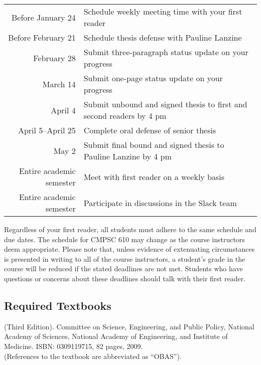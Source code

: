 \begin{center}
\begin{tabular}{r|l}
\hline

Before January 24  & Schedule weekly meeting time with your first reader \\
Before February 21 & Schedule thesis defense with Pauline Lanzine \\
February 28        & Submit three-paragraph status update on your progress \\
March 14           & Submit one-page status update on your progress \\
April 4            & Submit unbound and signed thesis to first and second readers by 4 pm \\
April 5--April 25  & Complete oral defense of senior thesis \\
May 2              & Submit final bound and signed thesis to Pauline Lanzine by 4 pm\\

\hline
Entire academic semester & Meet with first reader on a weekly basis \\
Entire academic semester & Participate in discussions in the Slack team \\
\hline
\end{tabular}
\end{center}

\noindent Regardless of your first reader, all students must adhere to the same schedule and due dates. The schedule for
CMPSC 610 may change as the course instructors deem appropriate. Please note that, unless evidence of extenuating
circumstances is presented in writing to all of the course instructors, a student's grade in the course will be reduced
if the stated deadlines are not met. Students who have questions or concerns about these deadlines should talk with
their first reader.

\vspace{-.15in}
\subsection*{Required Textbooks}
\vspace{-.05in}

 (Third Edition). Committee on Science,
Engineering, and Public Policy, National Academy of Sciences, National Academy of Engineering, and Institute of
Medicine. ISBN: 0309119715, 82 pages, 2009.\\ (References to the textbook are abbreviated as ``OBAS'').

